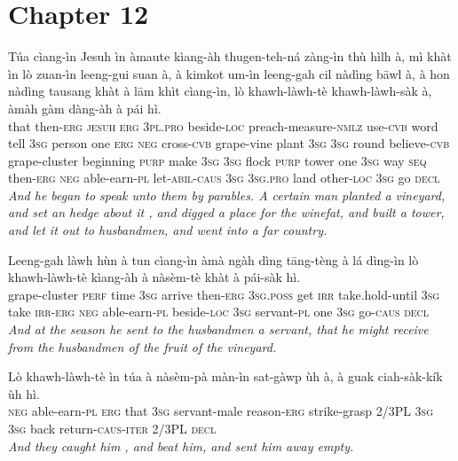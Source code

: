 \documentclass[11pt,a4paper]{article}
\begin{document}
\section*{Chapter 12}

\begin{exe}
\gll Túa cìang-ìn Jesuh ìn àmaute kìang-àh thugen-teh-ná zàng-ìn thù hìlh à, mì khàt ìn lò zuan-ìn leeng-gui suan à, à kimkot um-ìn leeng-gah cil nàdìng bāwl à, à hon nàdìng tausang khàt à lām khìt cìang-ìn, lò khawh-làwh-tè khawh-làwh-sàk à, àmàh gàm dàng-àh à pái hì. \\
     that then-\textsc{erg} \textsc{jesuh} \textsc{erg} \textsc{3pl}.\textsc{pro} beside-\textsc{loc} preach-measure-\textsc{nmlz} use-\textsc{cvb} word tell \textsc{3sg} person one \textsc{erg} \textsc{neg} cross-\textsc{cvb} grape-vine plant \textsc{3sg} \textsc{3sg} round believe-\textsc{cvb} grape-cluster beginning \textsc{purp} make \textsc{3sg} \textsc{3sg} flock \textsc{purp} tower one \textsc{3sg} way \textsc{seq} then-\textsc{erg} \textsc{neg} able-earn-\textsc{pl} let-\textsc{abil}-\textsc{caus} \textsc{3sg} \textsc{3sg}.\textsc{pro} land other-\textsc{loc} \textsc{3sg} go \textsc{decl} \\
\glt \textcolor{kjvcolor}{\textit{And he began to speak unto them by parables. A certain man planted a vineyard, and set an hedge about it , and digged a place for the winefat, and built a tower, and let it out to husbandmen, and went into a far country.}}

\gll Leeng-gah làwh hùn à tun cìang-ìn àmà ngàh dìng tāng-tèng à lá dìng-ìn lò khawh-làwh-tè kìang-àh à nàsèm-tè khàt à pái-sàk hì. \\
     grape-cluster \textsc{perf} time \textsc{3sg} arrive then-\textsc{erg} \textsc{3sg}.\textsc{poss} get \textsc{irr} take.hold-until \textsc{3sg} take \textsc{irr}-\textsc{erg} \textsc{neg} able-earn-\textsc{pl} beside-\textsc{loc} \textsc{3sg} servant-\textsc{pl} one \textsc{3sg} go-\textsc{caus} \textsc{decl} \\
\glt \textcolor{kjvcolor}{\textit{And at the season he sent to the husbandmen a servant, that he might receive from the husbandmen of the fruit of the vineyard.}}

\gll Lò khawh-làwh-tè ìn túa à nàsèm-pà màn-ìn sat-gàwp ùh à, à guak ciah-sàk-kík ùh hì. \\
     \textsc{neg} able-earn-\textsc{pl} \textsc{erg} that \textsc{3sg} servant-male reason-\textsc{erg} strike-grasp 2/3PL \textsc{3sg} \textsc{3sg} back return-\textsc{caus}-\textsc{iter} 2/3PL \textsc{decl} \\
\glt \textcolor{kjvcolor}{\textit{And they caught him , and beat him, and sent him away empty.}}


\end{exe}
\end{document}

